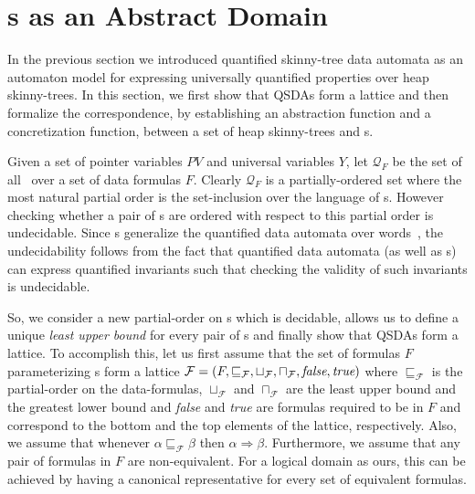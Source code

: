 \documentclass{llncs}
\newcommand{\lub}{\sqcup}
\newcommand{\glb}{\sqcap}
\newcommand{\PV}{\mathit{PV}}
\newcommand{\F}{\mathcal{F}}
\begin{document}
\section{\QSDA s as an Abstract Domain}

In the previous section we introduced quantified skinny-tree data automata as an automaton model for expressing universally quantified properties over heap skinny-trees. In this section, we first show that QSDAs form a lattice and then formalize the correspondence, by establishing an abstraction function and a concretization function, between a set of heap skinny-trees and \QSDA s.

Given a set of pointer variables $\PV$ and universal variables $Y$, let $\mathcal{Q}_F$ be the set of all \QSDA\ over a set of data formulas $F$. Clearly $\mathcal{Q}_F$ is a partially-ordered set where the most natural partial order is the set-inclusion over the language of \QSDA s.
However checking whether a pair of \QSDA s are ordered with respect to this partial order is undecidable. Since \QSDA s generalize the quantified data automata over words~\cite{CAVQDA}, the undecidability follows from the fact that quantified data automata (as well as \QSDA s) can express quantified invariants such that checking the validity of such invariants is undecidable.


So, we consider a new partial-order on \QSDA s which is decidable, allows us to define a unique \emph{least upper bound} for every pair of \QSDA s and finally show that QSDAs form a lattice. To accomplish this, let us first assume that the set of formulas $F$ parameterizing \QSDA s  form a lattice $\F = (F, \sqsubseteq_\F, \lub_\F, \glb_\F, \emph{false}, \emph{true})$ where $\sqsubseteq_\F$ is the partial-order on the data-formulas, $\lub_\F$ and $\glb_\F$ are the least upper bound and the greatest lower bound and \emph{false} and \emph{true} are formulas required to be in $F$ and correspond to the bottom and the top elements of the lattice, respectively. Also, we assume  that whenever $\alpha \sqsubseteq_\F \beta$ then $\alpha \Rightarrow \beta$. Furthermore, we assume that any pair of formulas in $F$ are non-equivalent.
For a  logical domain as ours, this can be achieved by having a canonical representative for every set of equivalent formulas.
\end{document}
